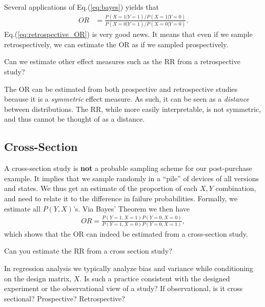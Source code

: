 Several applications of Eq.(\ref{eq:bayes}) yields that 
\begin{align}
\label{eq:retrospective_OR}
	OR 	&= \frac{P(X=1|Y=1)/P(X=1|Y=0)}{P(X=0|Y=1)/P(X=0|Y=0)}.
\end{align}
Eq.(\ref{eq:retrospective_OR}) is very good news. 
It means that even if we sample retrospectively, we can estimate the OR as if we sampled prospectively. 

\begin{think}
	Can we estimate other effect measures such as the RR from a retrospective study?
\end{think}


\begin{extra}
	The OR can be estimated from both prospective and retrospective studies because it is a \emph{symmetric} effect measure. As such, it can be seen as a \emph{distance} between distributions.
	The RR, while more easily interpretable, is not symmetric, and thus cannot be thought of as a distance. 
\end{extra}


\subsection{Cross-Section}
A cross-section study is \textbf{not} a probable sampling scheme for our post-purchase example. 
It implies that we sample randomly in a ``pile'' of devices of all versions and states. 
We thus get an estimate of the proportion of each $X,Y$ combination, and need to relate it to the difference in failure probabilities. 
Formally, we estimate all $P(Y,X)$'s.
Via Bayes' Theorem we then have 
\begin{align*}
	OR = \frac{P(Y=1,X=1)P(Y=0,X=0)}{P(Y=1,X=0)P(Y=0,X=1)},
\end{align*}
which shows that the OR can indeed be estimated from a cross-section study.

\begin{think}
	Can you estimate the RR from a cross section study?
\end{think}


\begin{think}
	In regression analysis we typically analyze bias and variance while conditioning on the design matrix, $X$. 
	Is such a practice consistent with the designed experiment or the observational view of a study?
	If observational, is it cross sectional? Prospective? Retrospective? 
\end{think}





